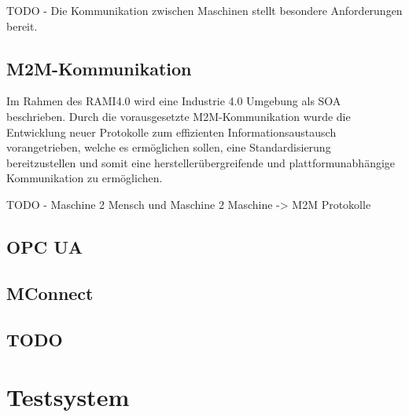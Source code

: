 TODO - Die Kommunikation zwischen Maschinen stellt besondere Anforderungen bereit.
\subsection{M2M-Kommunikation}
Im Rahmen des \ac{RAMI4.0} wird eine Industrie 4.0 Umgebung als \ac{SOA} beschrieben. Durch die vorausgesetzte M2M-Kommunikation wurde die Entwicklung neuer Protokolle zum effizienten Informationsaustausch vorangetrieben, welche es ermöglichen sollen, eine Standardisierung bereitzustellen und somit eine herstellerübergreifende und plattformunabhängige Kommunikation zu ermöglichen.

TODO - Maschine 2 Mensch und Maschine 2 Maschine -> M2M Protokolle

\subsection{OPC UA}
\subsection{MConnect}
\subsection{TODO}

\section{Testsystem}